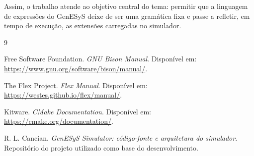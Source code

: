 \documentclass[12pt,a4paper]{article}
\begin{document}
Assim, o trabalho atende ao objetivo central do tema: permitir que a linguagem de express\~oes do GenESyS deixe de ser uma gram\'atica fixa e passe a refletir, em tempo de execu\c{c}\~ao, as extens\~oes carregadas no simulador.

\begin{thebibliography}{9}

Free Software Foundation.
\textit{GNU Bison Manual}.
Dispon\'ivel em: \url{https://www.gnu.org/software/bison/manual/}.

The Flex Project.
\textit{Flex Manual}.
Dispon\'ivel em: \url{https://westes.github.io/flex/manual/}.

Kitware.
\textit{CMake Documentation}.
Dispon\'ivel em: \url{https://cmake.org/documentation/}.

R. L. Cancian.
\textit{GenESyS Simulator: c\'odigo-fonte e arquitetura do simulador}.
Reposit\'orio do projeto utilizado como base do desenvolvimento.

\end{thebibliography}
\end{document}
